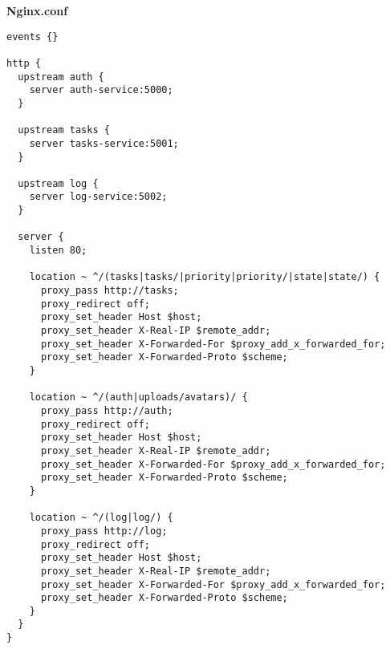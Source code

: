 \textbf{Nginx.conf}
\begin{lstlisting}[style=CodeListing]
events {}

http {
  upstream auth {
    server auth-service:5000;
  }

  upstream tasks {
    server tasks-service:5001;
  }

  upstream log {
    server log-service:5002;
  }

  server {
    listen 80;

    location ~ ^/(tasks|tasks/|priority|priority/|state|state/) {
      proxy_pass http://tasks;
      proxy_redirect off;
      proxy_set_header Host $host;
      proxy_set_header X-Real-IP $remote_addr;
      proxy_set_header X-Forwarded-For $proxy_add_x_forwarded_for;
      proxy_set_header X-Forwarded-Proto $scheme;
    }

    location ~ ^/(auth|uploads/avatars)/ {
      proxy_pass http://auth;
      proxy_redirect off;
      proxy_set_header Host $host;
      proxy_set_header X-Real-IP $remote_addr;
      proxy_set_header X-Forwarded-For $proxy_add_x_forwarded_for;
      proxy_set_header X-Forwarded-Proto $scheme;
    }

    location ~ ^/(log|log/) {
      proxy_pass http://log;
      proxy_redirect off;
      proxy_set_header Host $host;
      proxy_set_header X-Real-IP $remote_addr;
      proxy_set_header X-Forwarded-For $proxy_add_x_forwarded_for;
      proxy_set_header X-Forwarded-Proto $scheme;
    }
  }
}
\end{lstlisting}